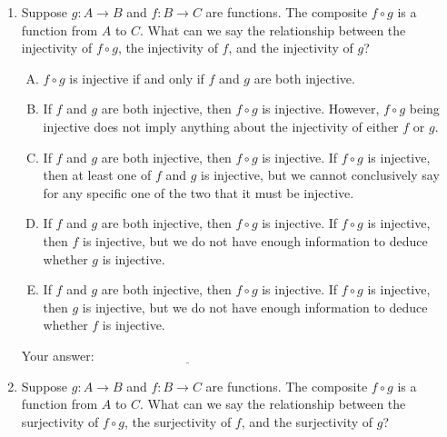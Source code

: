 \documentclass[10pt]{amsart}
\begin{document}
\begin{enumerate}
\item Suppose $g:A \to B$ and $f:B \to C$ are functions. The composite
  $f \circ g$ is a function from $A$ to $C$. What can we say the
  relationship between the injectivity of $f \circ g$, the injectivity
  of $f$, and the injectivity of $g$?

  \begin{enumerate}[(A)]
  \item $f \circ g$ is injective if and only if $f$ and $g$ are both injective.
  \item If $f$ and $g$ are both injective, then $f \circ g$ is
    injective. However, $f \circ g$ being injective does not imply
    anything about the injectivity of either $f$ or $g$.
  \item If $f$ and $g$ are both injective, then $f \circ g$ is
    injective. If $f \circ g$ is injective, then at least one of $f$
    and $g$ is injective, but we cannot conclusively say for any
    specific one of the two that it must be injective.
  \item If $f$ and $g$ are both injective, then $f \circ g$ is
    injective. If $f \circ g$ is injective, then $f$ is injective, but
    we do not have enough information to deduce whether $g$ is
    injective.
  \item If $f$ and $g$ are both injective, then $f \circ g$ is
    injective. If $f \circ g$ is injective, then $g$ is injective, but
    we do not have enough information to deduce whether $f$ is
    injective.
  \end{enumerate}

  \vspace{0.1in}
  Your answer: $\underline{\qquad\qquad\qquad\qquad\qquad\qquad\qquad}$
  \vspace{0.1in}

\item Suppose $g:A \to B$ and $f:B \to C$ are functions. The composite
  $f \circ g$ is a function from $A$ to $C$. What can we say the
  relationship between the surjectivity of $f \circ g$, the surjectivity
  of $f$, and the surjectivity of $g$?


\end{enumerate}
\end{document}
